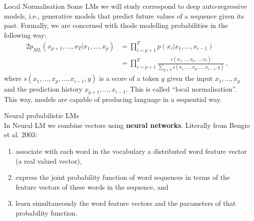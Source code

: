 \documentclass[9pt]{beamer}
\begin{document}
\begin{frame}{Local Normalisation}
    Some LMs we will study correspond to deep auto-regressive models, i.e., generative models that predict future values of a sequence given its past. Formally, we are concerned with thode modelling probabilities in the following way:
    \begin{alignat*}{2}
    p_{ML}(x_{p+1},\dots,x_T|x_1,\dots,x_p) & = \prod_{i=p+1}^T p(x_i|x_1,\dots,x_{i-1}) \\
    & = \prod_{i=p+1}^T \frac{s(x_1,\dots,x_p,\dots,x_{i})}{\sum_{y\in V}s(x_1,\dots,x_p,\dots,x_{i-1},y)}\,,
    \end{alignat*}
    where $s(x_1,\dots,x_p,\dots,x_{i-1},y)$ is a score of a token $y$ given the input $x_1,\dots,x_p$ and the prediction history $x_{p+1},\dots,x_{i-1}$. This is called ``local normalisation''. This way, models are capable of producing language in a sequential way.
\end{frame}


\begin{frame}{Neural probabilistic LMs}
    \vspace{0.3cm}\\
    In Neural LM we combine vectors using \textbf{neural networks}. Literally from Bengio et al. 2003:
    \begin{enumerate}
        \item associate with each word in the vocabulary a distributed word feature vector (a real valued vector), 
        \item express the joint probability function of word sequences in terms of the feature vectors of these words in the sequence, and 
        \item learn simultaneously the word feature vectors and the parameters of that probability function.
    \end{enumerate}
\end{frame}
\end{document}
